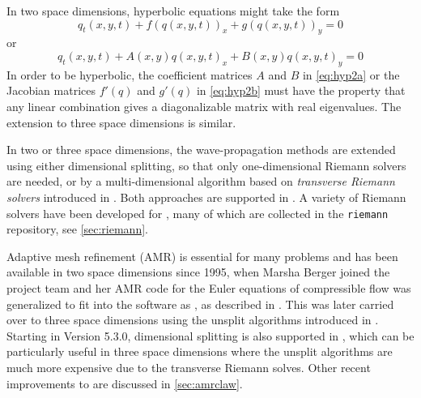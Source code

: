 In two space dimensions, hyperbolic equations might take the form
\begin{equation}\label{eq:hyp2a}
q_t(x,y,t) + f(q(x,y,t))_x + g(q(x,y,t))_y = 0
\end{equation}
or
\begin{equation}\label{eq:hyp2b}
q_t(x,y,t) + A(x,y)q(x,y,t)_x + B(x,y)q(x,y,t)_y = 0
\end{equation}
In order to be hyperbolic, the coefficient matrices $A$ and $B$ in \cref{eq:hyp2a}
or the Jacobian matrices $f'(q)$ and $g'(q)$ in \cref{eq:hyp2b} 
must have the property that any linear
combination gives a diagonalizable matrix with real eigenvalues.  The
extension to three space dimensions is similar. 

In two or three space dimensions, the wave-propagation methods
are extended using either dimensional splitting, so that only
one-dimensional Riemann solvers are needed, or by a multi-dimensional
algorithm based on {\em transverse Riemann solvers} introduced in
\cite{rjl:wpalg}.  Both approaches are supported in \clawpack.
A variety of Riemann solvers have been developed for \clawpack, many
of which are collected in the \texttt{riemann} repository, see
\cref{sec:riemann}.  

Adaptive mesh refinement (AMR) is essential for many problems and
has been available in two space dimensions
since 1995, when Marsha Berger joined the project team and her AMR
code for the Euler equations of compressible flow was generalized to fit into
the software as \amrclaw, as described in \cite{Berger:1998ia}.  This was
later carried over to three space dimensions using the unsplit algorithms
introduced in \cite{jol-rjl:3d}.  Starting in Version 5.3.0, dimensional
splitting is also supported in \amrclaw, which can be particularly useful in
three space dimensions where the unsplit algorithms are much more expensive
due to the transverse Riemann solves.  Other recent improvements to \amrclaw
are discussed in \cref{sec:amrclaw}.

